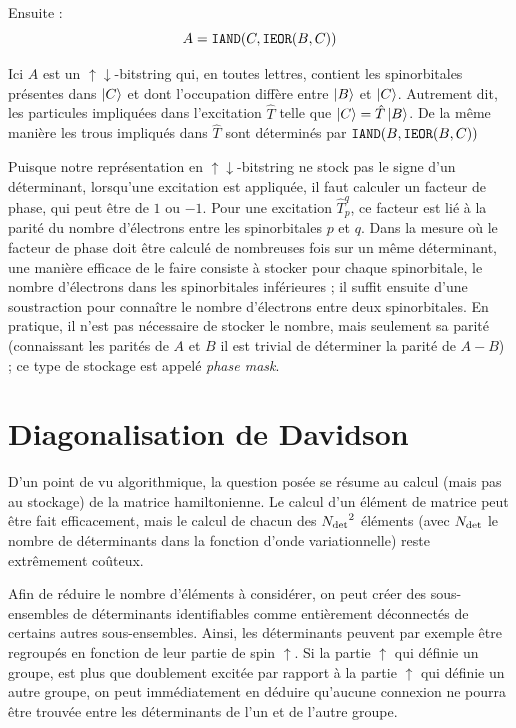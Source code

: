 \documentclass[./thesis.tex]{subfiles}
\begin{document}
Ensuite :
\begin{equation}
A = \text{\texttt{IAND}}(C,\text{\texttt{IEOR}}(B,C))
\end{equation}

Ici $A$ est un $\uparrow \downarrow$-bitstring qui, en toutes lettres, contient les spinorbitales présentes dans $\ket C$ et dont l'occupation diffère entre $\ket B$ et $\ket C$. Autrement dit, les particules impliquées dans l'excitation $\hat T$ telle que $\ket C = \hat T \ket B$. De la même manière les trous impliqués dans $\hat T$ sont déterminés par $\text{\texttt{IAND}}(B,\text{\texttt{IEOR}}(B,C))$

Puisque notre représentation en $\uparrow \downarrow$-bitstring ne stock pas le signe d'un déterminant, lorsqu'une excitation est appliquée, il faut calculer un facteur de phase, qui peut être de $1$ ou $-1$. Pour une excitation $\hat T_p^q$, ce facteur est lié à la parité du nombre d'électrons entre les spinorbitales $p$ et $q$. Dans la mesure où le facteur de phase doit être calculé de nombreuses fois sur un même déterminant, une manière efficace de le faire consiste à stocker pour chaque spinorbitale, le nombre d'électrons dans les spinorbitales inférieures ; il suffit ensuite d'une soustraction pour connaître le nombre d'électrons entre deux spinorbitales. En pratique, il n'est pas nécessaire de stocker le nombre, mais seulement sa parité (connaissant les parités de $A$ et $B$ il est trivial de déterminer la parité de $A-B$) ; ce type de stockage est appelé \emph{phase mask}.
\section{Diagonalisation de Davidson}

D'un point de vu algorithmique, la question posée se résume au calcul (mais pas au stockage) de la matrice hamiltonienne. Le calcul d'un élément de matrice peut être fait efficacement, mais le calcul de chacun des ${N_\text{det}}^2$ éléments (avec ${N_\text{det}}$ le nombre de déterminants dans la fonction d'onde variationnelle) reste extrêmement coûteux.

Afin de réduire le nombre d'éléments à considérer, on peut créer des sous-ensembles de déterminants identifiables comme entièrement déconnectés de certains autres sous-ensembles. Ainsi, les déterminants peuvent par exemple être regroupés en fonction de leur partie de spin $\uparrow$. Si la partie $\uparrow$ qui définie un groupe, est plus que doublement excitée par rapport à la partie $\uparrow$ qui définie un autre groupe, on peut immédiatement en déduire qu'aucune connexion ne pourra être trouvée entre les déterminants de l'un et de l'autre groupe.
\end{document}
